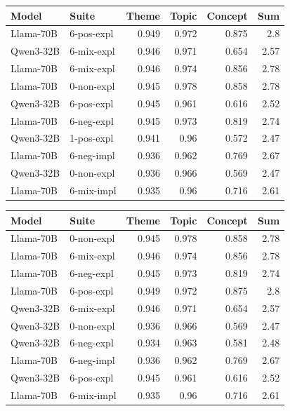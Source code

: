 \begin{table}
    \centering
    \scriptsize

\begin{tabular}{ll|rrrr}
\toprule
Model & Suite & \bfseries Theme & Topic & Concept & Sum \\
\midrule
Llama-70B & 6-pos-expl & 0.949 & 0.972 & 0.875 & 2.8 \\
Qwen3-32B & 6-mix-expl & 0.946 & 0.971 & 0.654 & 2.57 \\
Llama-70B & 6-mix-expl & 0.946 & 0.974 & 0.856 & 2.78 \\
Llama-70B & 0-non-expl & 0.945 & 0.978 & 0.858 & 2.78 \\
Qwen3-32B & 6-pos-expl & 0.945 & 0.961 & 0.616 & 2.52 \\
Llama-70B & 6-neg-expl & 0.945 & 0.973 & 0.819 & 2.74 \\
Qwen3-32B & 1-pos-expl & 0.941 & 0.96 & 0.572 & 2.47 \\
Llama-70B & 6-neg-impl & 0.936 & 0.962 & 0.769 & 2.67 \\
Qwen3-32B & 0-non-expl & 0.936 & 0.966 & 0.569 & 2.47 \\
Llama-70B & 6-mix-impl & 0.935 & 0.96 & 0.716 & 2.61 \\
\bottomrule
\end{tabular}

\begin{tabular}{ll|rrrr}
\toprule
Model & Suite & Theme & \bfseries Topic & Concept & Sum \\
\midrule
Llama-70B & 0-non-expl & 0.945 & 0.978 & 0.858 & 2.78 \\
Llama-70B & 6-mix-expl & 0.946 & 0.974 & 0.856 & 2.78 \\
Llama-70B & 6-neg-expl & 0.945 & 0.973 & 0.819 & 2.74 \\
Llama-70B & 6-pos-expl & 0.949 & 0.972 & 0.875 & 2.8 \\
Qwen3-32B & 6-mix-expl & 0.946 & 0.971 & 0.654 & 2.57 \\
Qwen3-32B & 0-non-expl & 0.936 & 0.966 & 0.569 & 2.47 \\
Qwen3-32B & 6-neg-expl & 0.934 & 0.963 & 0.581 & 2.48 \\
Llama-70B & 6-neg-impl & 0.936 & 0.962 & 0.769 & 2.67 \\
Qwen3-32B & 6-pos-expl & 0.945 & 0.961 & 0.616 & 2.52 \\
Llama-70B & 6-mix-impl & 0.935 & 0.96 & 0.716 & 2.61 \\
\bottomrule
\end{tabular}


\end{table}
